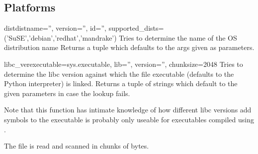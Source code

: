 \subsection{\UNIX{} Platforms}

\begin{funcdesc}{dist}{distname='', version='', id='',
                       supported_dists=('SuSE','debian','redhat','mandrake')}
  Tries to determine the name of the OS distribution name
  Returns a tuple 
  which defaults to the args given as parameters.
\end{funcdesc}


\begin{funcdesc}{libc_ver}{executable=sys.executable, lib='',
                           version='', chunksize=2048}
  Tries to determine the libc version against which the file
  executable (defaults to the Python interpreter) is linked.  Returns
  a tuple of strings  which default
  to the given parameters in case the lookup fails.

  Note that this function has intimate knowledge of how different
  libc versions add symbols to the executable is probably only
  useable for executables compiled using .

  The file is read and scanned in chunks of  bytes.
\end{funcdesc}

